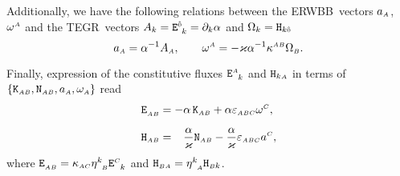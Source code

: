 \documentclass[
10pt, %
a4paper, %
oneside, %
twocolumn,
headinclude,footinclude, %
BCOR5mm, %
]{scrartcl}
\newcommand{\ERWBB}{{ERWBB}}
\newcommand{\sA}{\mathsmaller A}
\newcommand{\sB}{\mathsmaller B}
\newcommand{\sC}{\mathsmaller C}
\newcommand{\pd}[1]{\partial_{#1}}
\newcommand{\mg}[1]{\kappa_{#1}}			%
\newcommand{\MG}[1]{\kappa^{#1}}			%
\newcommand{\itetrsymbol}{\eta}
\newcommand{\itetr}[2]{\itetrsymbol^{#1}_{\phantom{#1}#2}}
\newcommand{\Dfin}[2]{\mathtt{D}_{\phantom{#2}#1}^{#2}}	%
\newcommand{\Hfin}[2]{\mathtt{H}_{#2#1}}	%
\newcommand{\Efin}[2]{\mathtt{E}^{#1}_{\phantom{#1}#2}}	%
\newcommand{\Kbuch}[2]{\mathtt{K}_{{#1}{#2}}}	%
\newcommand{\Nbuchdown}[2]{\mathtt{N}_{#1#2}}	%
\newcommand{\Bfin}[2]{\mathtt{B}^{#1#2}}	%
\newcommand{\LCtens}{\varepsilon} %
\newcommand{\tegr}{TEGR}
\newcommand{\indalg}[1]{\hat{\mathsmaller{#1}}}
\newcommand{\lapse}{\alpha}
\begin{document}
	Additionally, we have the following relations between the \ERWBB\ vectors $
	a_{\sA} $, $ \omega^{\sA} $ and the \tegr\ vectors $
	A_{k}=\Efin{\indalg{0}}{k} = \pd{k}\lapse $ and $ \Omega_{k} =
	\Hfin{\indalg{0}}{k} $
	\begin{equation}\label{eqn.Buchman.TEGR.AW}
		a_{\sA} = \lapse^{-1} A_{\sA},
		\qquad
		\omega^{\sA} =-\varkappa \lapse^{-1} \MG{\sA\sB} \Omega_{\sB}.
	\end{equation}
	
	Finally, expression of the 
	constitutive fluxes $ \Efin{\sA}{k} $ and $ \Hfin{\sA}{k} $ in terms of $ 
	\{\Kbuch{\sA}{\sB},\Nbuchdown{\sA}{\sB},a_{\sA},\omega_{\sA}\} $ read
	\begin{subequations}\label{eqn.const.KN}
		\begin{align}
			\Efin{}{\sA\sB} &=
			- \lapse \,\Kbuch{\sA}{\sB} 
			+ \lapse \LCtens_{\sA\sB\sC} \omega^\sC ,
			\\[2mm]
			\Hfin{\sB}{\sA} &= 
			\phantom{-}\frac{\lapse}{\varkappa} \Nbuchdown{\sA}{\sB} 
			- \frac{\lapse}{\varkappa} 
			\LCtens_{\sA\sB\sC} a^\sC ,
		\end{align}
	\end{subequations}
	where $\Efin{}{\sA\sB} = \mg{\sA\sC}\itetr{k}{\sB}\Efin{\sC}{k}$ and $\Hfin{\sA}{\sB} = \itetr{k}{\sA}\Hfin{k}{\sB}$.
	
	
	
	
\end{document}
